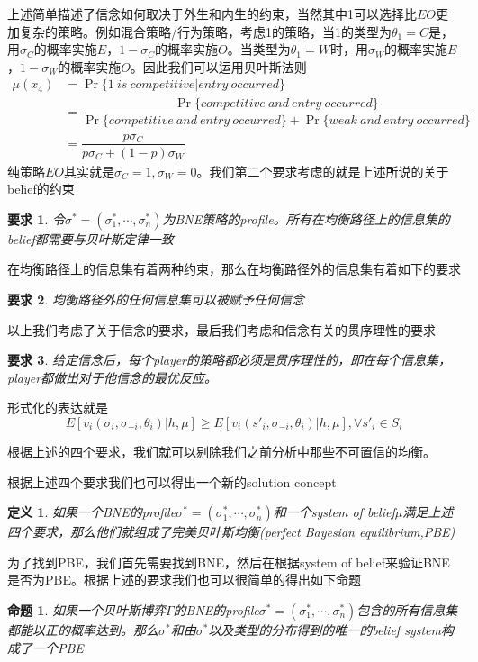 \documentclass[UTF8,12pt]{ctexart}
\newtheorem{Def}{定义}[section]
\newtheorem{Prop}{命题}[section]
\newtheorem{Req}{要求}[section]
\numberwithin{equation}{section} %
\numberwithin{figure}{section}
\numberwithin{table}{section}
\begin{document}
	上述简单描述了信念如何取决于外生和内生的约束，当然其中1可以选择比$EO$更加复杂的策略。例如混合策略/行为策略，考虑1的策略，当1的类型为$\theta_1 = C$是，用$\sigma_C$的概率实施$E$，$1-\sigma_C$的概率实施$O$。当类型为$\theta_1 = W$时，用$\sigma_W$的概率实施$E$，$1-\sigma_W$的概率实施$O$。因此我们可以运用贝叶斯法则
	\begin{equation}
		\begin{aligned}
			\mu(x_4)
			&= \Pr\{1 \ is \ competitive | entry \ occurred\} \\
			&= \dfrac{\Pr\{competitive \ and \ entry \ occurred\}}{\Pr\{competitive \ and \ entry \ occurred\} + \Pr\{weak \ and \ entry \ occurred\}} \\
			&= \dfrac{p\sigma_C}{p\sigma_C + (1-p)\sigma_W}
		\end{aligned}
	\end{equation}
	纯策略$EO$其实就是$\sigma_C = 1,\sigma_W = 0$。我们第二个要求考虑的就是上述所说的关于belief的约束
	\begin{Req}
		令$\sigma^* = (\sigma^*_1,\cdots,\sigma^*_n)$为BNE策略的profile。所有在均衡路径上的信息集的belief都需要与贝叶斯定律一致
	\end{Req}
	在均衡路径上的信息集有着两种约束，那么在均衡路径外的信息集有着如下的要求
	\begin{Req}
		均衡路径外的任何信息集可以被赋予任何信念
	\end{Req}
	以上我们考虑了关于信念的要求，最后我们考虑和信念有关的贯序理性的要求
	\begin{Req}
		给定信念后，每个player的策略都必须是贯序理性的，即在每个信息集，player都做出对于他信念的最优反应。
	\end{Req}
	形式化的表达就是
	\begin{equation}
		E[v_i(\sigma_i,\sigma_{-i},\theta_i)|h,\mu] \geqslant E[v_i(s'_i,\sigma_{-i},\theta_i)|h,\mu],\forall s'_i \in S_i
	\end{equation}

	根据上述的四个要求，我们就可以剔除我们之前分析中那些不可置信的均衡。
	
	根据上述四个要求我们也可以得出一个新的solution concept
	\begin{Def}
		如果一个BNE的profile$\sigma^* = (\sigma^*_1,\cdots,\sigma^*_n)$和一个system of belief$\mu$满足上述四个要求，那么他们就组成了完美贝叶斯均衡(perfect Bayesian equilibrium,PBE)
	\end{Def}
	为了找到PBE，我们首先需要找到BNE，然后在根据system of belief来验证BNE是否为PBE。根据上述的要求我们也可以很简单的得出如下命题
	\begin{Prop}
		如果一个贝叶斯博弈$\Gamma$的BNE的profile$\sigma^* = (\sigma^*_1,\cdots,\sigma^*_n)$包含的所有信息集都能以正的概率达到。那么$\sigma^*$和由$\sigma^*$以及类型的分布得到的唯一的belief system构成了一个PBE
	\end{Prop}
\end{document}
